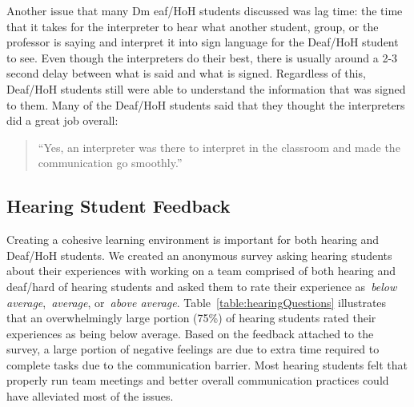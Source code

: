 \documentclass[conference]{IEEEtran}
\begin{document}
Another issue that many Dm   eaf/HoH students discussed was lag time: the time that it takes for the interpreter to hear what another student, group, or the professor is saying and interpret it into sign language for the Deaf/HoH student to see. Even though the interpreters do their best, there is usually around a 2-3 second delay between what is said and what is signed. Regardless of this, Deaf/HoH students still were able to understand the information that was signed to them. Many of the Deaf/HoH students said that they thought the interpreters did a great job overall:

\begin{quotation}
``Yes, an interpreter was there to interpret in the classroom and made the communication go smoothly.''
\end{quotation}

\subsection{Hearing Student Feedback}

Creating a cohesive learning environment is important for both hearing and Deaf/HoH students. We created an anonymous survey asking hearing students about their experiences with working on a team comprised of both hearing and deaf/hard of hearing students and asked them to rate their experience as~\emph{below average},~\emph{average}, or~\emph{above average}. Table~\ref{table:hearingQuestions} illustrates that an overwhelmingly large portion (75\%) of hearing students rated their experiences as being below average. Based on the feedback attached to the survey, a large portion of negative feelings are due to extra time required to complete tasks due to the communication barrier. Most hearing students felt that properly run team meetings and better overall communication practices could have alleviated most of the issues.


\end{document}
